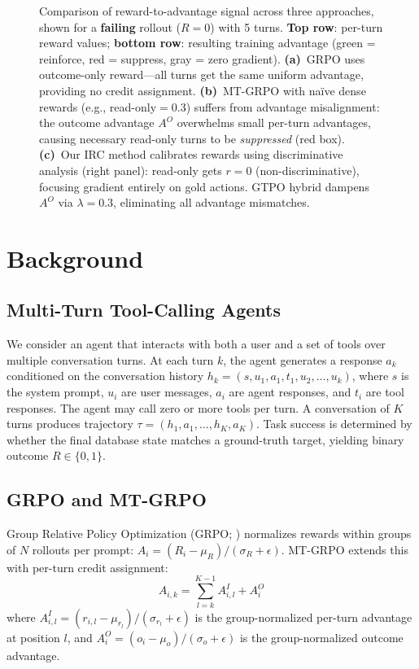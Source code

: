\documentclass[11pt]{article}
\newcommand{\irc}{\textsc{IRC}}
\begin{document}
\begin{figure}[t]
\begin{tikzpicture}
\end{tikzpicture}
\caption{Comparison of reward-to-advantage signal across three approaches, shown for a \textbf{failing} rollout ($R{=}0$) with 5 turns. \textbf{Top row}: per-turn reward values; \textbf{bottom row}: resulting training advantage (green = reinforce, red = suppress, gray = zero gradient). \textbf{(a)}~GRPO uses outcome-only reward---all turns get the same uniform advantage, providing no credit assignment. \textbf{(b)}~MT-GRPO with na\"ive dense rewards (e.g., read-only$=$0.3) suffers from advantage misalignment: the outcome advantage $A^O$ overwhelms small per-turn advantages, causing necessary read-only turns to be \emph{suppressed} (red box). \textbf{(c)}~Our \irc{} method calibrates rewards using discriminative analysis (right panel): read-only gets $r{=}0$ (non-discriminative), focusing gradient entirely on gold actions. GTPO hybrid dampens $A^O$ via $\lambda{=}0.3$, eliminating all advantage mismatches.}
\label{fig:reward_comparison}
\end{figure}

\section{Background}
\label{sec:background}

\subsection{Multi-Turn Tool-Calling Agents}

We consider an agent that interacts with both a user and a set of tools over multiple conversation turns. At each turn $k$, the agent generates a response $a_k$ conditioned on the conversation history $h_k = (s, u_1, a_1, t_1, u_2, \ldots, u_k)$, where $s$ is the system prompt, $u_i$ are user messages, $a_i$ are agent responses, and $t_i$ are tool responses. The agent may call zero or more tools per turn. A conversation of $K$ turns produces trajectory $\tau = (h_1, a_1, \ldots, h_K, a_K)$. Task success is determined by whether the final database state matches a ground-truth target, yielding binary outcome $R \in \{0, 1\}$.

\subsection{GRPO and MT-GRPO}

Group Relative Policy Optimization (GRPO; \citealp{shao2024deepseekmath}) normalizes rewards within groups of $N$ rollouts per prompt:
$A_i = (R_i - \mu_R) / (\sigma_R + \epsilon)$.
MT-GRPO \cite{zhang2025mt_grpo} extends this with per-turn credit assignment:
\begin{equation}
\label{eq:mtgrpo}
A_{i,k} = \sum_{l=k}^{K-1} A^I_{i,l} + A^O_i
\end{equation}
where $A^I_{i,l} = (r_{i,l} - \mu_{r_l}) / (\sigma_{r_l} + \epsilon)$ is the group-normalized per-turn advantage at position $l$, and $A^O_i = (o_i - \mu_o) / (\sigma_o + \epsilon)$ is the group-normalized outcome advantage.
\end{document}
